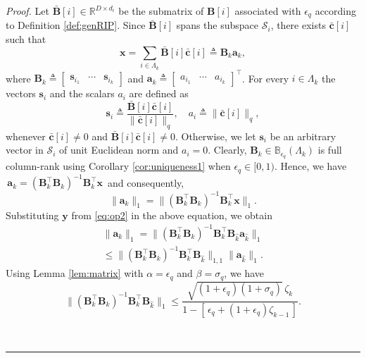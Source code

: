\documentclass[10pt,twocolumn,twoside] {IEEEtran}
\newenvironment{proof}{\emph{Proof.}}{\hfill{~\rule[-1pt]{5pt}{5pt}\par\medskip}}
\begin{document}
{\begin{proof}
Let $\bar{\boldsymbol{B}}[i] \in {\mathbb{R}}^{D \times d_i}$ be the submatrix of ${\boldsymbol{B}}[i]$ associated with $\epsilon_{q}$ according to Definition \ref{def:genRIP}. Since $\bar{\boldsymbol{B}}[i]$ spans the subspace $\mathcal{S}_i$, there exists $\bar{\boldsymbol{c}}[i]$ such that 
\begin{equation}
{{\mathbf x}} = \sum_{i \in \Lambda_k} \bar{\boldsymbol{B}}[i] \bar{\boldsymbol{c}}[i] \triangleq {\boldsymbol{B}}_k {\boldsymbol{a}}_k,
\end{equation}
where ${\boldsymbol{B}}_k \triangleq \begin{bmatrix} {\boldsymbol{s}}_{i_1} \!\!& \cdots \!\!& {\boldsymbol{s}}_{i_k} \end{bmatrix}$ and ${\boldsymbol{a}}_k \triangleq \begin{bmatrix} a_{i_1} \!\! & \cdots \!\! & a_{i_k} \end{bmatrix}^{\top}$. For every $i \in \Lambda_k$ the vectors ${\boldsymbol{s}}_i$ and the scalars $a_i$ are defined as 
\begin{equation}
{\boldsymbol{s}}_i \triangleq \frac{\bar{\boldsymbol{B}}[i] \bar{\boldsymbol{c}}[i]}{ \| \bar{\boldsymbol{c}}[i] \|_q }, \quad a_i \triangleq \| \bar{\boldsymbol{c}}[i] \|_q,
\end{equation}
whenever $\bar{\boldsymbol{c}}[i] \neq 0$ and $\bar{\boldsymbol{B}}[i] \bar{\boldsymbol{c}}[i] \neq 0$. Otherwise, we let ${\boldsymbol{s}}_i$ be an arbitrary vector in $\mathcal{S}_i$ of unit Euclidean norm and $a_i = 0$. Clearly, ${\boldsymbol{B}}_k \in \mathbb{B}_{\epsilon_q}(\Lambda_k)$ is full column-rank using Corollary \ref{cor:uniqueness1} when $\epsilon_q \in [0,1)$. Hence, we have $\, {\boldsymbol{a}}_k = ({\boldsymbol{B}}_k^{\top} {\boldsymbol{B}}_k)^{-1}{\boldsymbol{B}}_k^{\top} {{\mathbf x}} \,$ and consequently,
\begin{equation}
\| {\boldsymbol{a}}_k \|_1 = \| ({\boldsymbol{B}}_k^{\top} {\boldsymbol{B}}_k)^{-1}{\boldsymbol{B}}_k^{\top} {{\mathbf x}} \|_1.
\end{equation}
Substituting ${\boldsymbol{y}}$ from \eqref{eq:op2} in the above equation, we obtain
\begin{multline}
\label{eq:interm1}
\| {\boldsymbol{a}}_k \|_1 = \| ({\boldsymbol{B}}_k^{\top} {\boldsymbol{B}}_k)^{-1}{\boldsymbol{B}}_k^{\top} {\boldsymbol{B}}_{\widehat{k}} {\boldsymbol{a}}_{\widehat{k}} \|_1 \\ \leq \| ({\boldsymbol{B}}_k^{\top} {\boldsymbol{B}}_k)^{-1}{\boldsymbol{B}}_k^{\top} {\boldsymbol{B}}_{\widehat{k}} \|_{1,1} \| {\boldsymbol{a}}_{\widehat{k}} \|_1.
\end{multline}
Using Lemma \ref{lem:matrix} with $\alpha = \epsilon_q$ and $\beta = \sigma_q$, we have
\begin{equation}
\| ({\boldsymbol{B}}_k^{\top} {\boldsymbol{B}}_k)^{-1} {\boldsymbol{B}}_k^{\top} {\boldsymbol{B}}_{\widehat{k}} \|_1 \leq \frac{ \sqrt{(1+\epsilon_q) (1+\sigma_q)} \, \zeta_k }{ 1 - [ \, \epsilon_q  + (1+\epsilon_q) \zeta_{k-1} \,] }. 
\end{equation}


\end{proof}}
\end{document}
